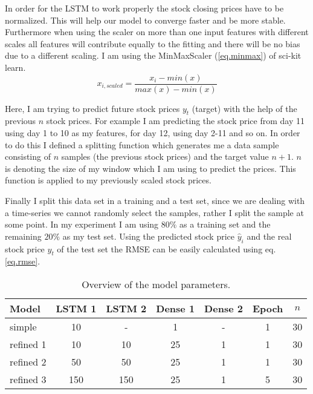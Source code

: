 \documentclass[fleqn,10pt]{SelfArx} %
\begin{document}
In order for the LSTM to work properly the stock closing prices have to be normalized. This will help our model to converge faster and be more stable. Furthermore when using the scaler on more than one input features with different scales all features will contribute equally to the fitting and there will be no bias due to a different scaling. I am using the MinMaxScaler (\ref{eq.minmax}) of sci-kit learn.
\begin{equation}
x_{i,scaled}=\dfrac{x_i-min(x)}{max(x)-min(x)}
\label{eq.minmax}
\end{equation}

Here, I am trying to predict future stock prices $y_t$ (target) with the help of the previous $n$ stock prices. For example I am predicting the stock price from day 11 using day 1 to 10 as my features, for day 12, using day 2-11 and so on. In order to do this I defined a splitting function which generates me a data sample consisting of $n$ samples (the previous stock prices) and the target value $n + 1$. $n$ is denoting the size of my window which I am using to predict the prices. This function is applied to my previously scaled stock prices. 

Finally I split this data set in a training and a test set, since we are dealing with a time-series we cannot randomly select the samples, rather I split the sample at some point. In my experiment I am using $80\%$ as a training set and the remaining $20\%$ as my test set. Using the predicted stock price $\hat{y}_i$ and the real stock price $y_t$ of the test set the RMSE can be easily calculated using eq. \ref{eq.rmse}.

\begin{table*}[hbt]
	\caption{Overview of the model parameters.}
	\centering
\begin{tabular}{lcccccc}
\hline
Model & LSTM 1 & LSTM 2 & Dense 1 & Dense 2 & Epoch & $n$ \\ 
\hline 
simple & 10 & - & 1 & - & 1 & 30 \\ 

refined 1 & 10 & 10 & 25 & 1 & 1 & 30 \\ 

refined 2 & 50 & 50 & 25 & 1 & 1 & 30 \\ 

refined 3 & 150 & 150 & 25 & 1 & 5 & 30 \\
\end{tabular}

\label{table.model} 
\end{table*}
\end{document}

